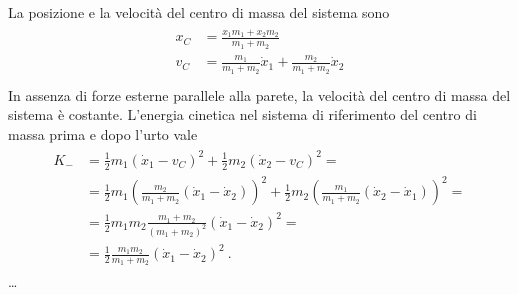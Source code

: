 \documentclass[letterpaper,10pt,italian]{jupyterBook}
\begin{document}
\sphinxAtStartPar
La posizione e la velocità del centro di massa del sistema sono
\begin{equation*}
\begin{split}\begin{aligned}
  x_C & = \frac{x_1 m_1 + x_2 m_2}{m_1 + m_2} \\
  v_C & = \frac{m_1}{m_1+m_2} \dot{x}_1 + \frac{m_2}{m_1+m_2} \dot{x}_2  \\
\end{aligned}\end{split}
\end{equation*}
\sphinxAtStartPar
In assenza di forze esterne parallele alla parete, la velocità del centro di massa del sistema è costante.
L’energia cinetica nel sistema di riferimento del centro di massa prima e dopo l’urto vale
\begin{equation*}
\begin{split}\begin{aligned}
  K_- 
  & = \frac{1}{2} m_1 (\dot{x}_1 - v_C)^2 + \frac{1}{2} m_2 (\dot{x}_2 - v_C)^2 = \\
  & = \frac{1}{2} m_1 \left( \frac{m_2}{m_1+m_2} (\dot{x}_1 - \dot{x}_2) \right)^2 + \frac{1}{2} m_2 \left( \frac{m_1}{m_1+m_2} (\dot{x}_2 - \dot{x}_1) \right)^2 = \\
  & = \frac{1}{2} m_1 m_2 \frac{m_1 + m_2}{(m_1 + m_2)^2} (\dot{x}_1 - \dot{x}_2)^2 = \\
  & = \frac{1}{2} \frac{ m_1 m_2}{m_1 + m_2} (\dot{x}_1 - \dot{x}_2)^2 \ .
\end{aligned}\end{split}
\end{equation*}
\sphinxAtStartPar
…
\end{document}
